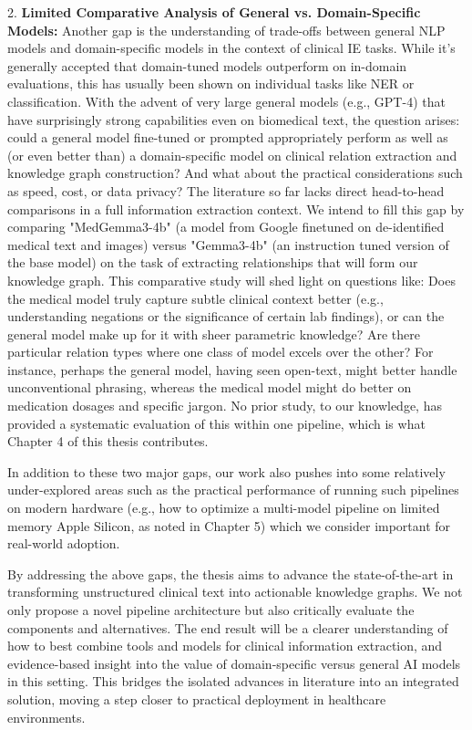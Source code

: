 2. \textbf{Limited Comparative Analysis of General vs. Domain-Specific Models:} Another gap is the understanding of trade-offs between general NLP models and domain-specific models in the context of clinical IE tasks. While it's generally accepted that domain-tuned models outperform on in-domain evaluations, this has usually been shown on individual tasks like NER or classification. With the advent of very large general models (e.g., GPT-4) that have surprisingly strong capabilities even on biomedical text, the question arises: could a general model fine-tuned or prompted appropriately perform as well as (or even better than) a domain-specific model on clinical relation extraction and knowledge graph construction? And what about the practical considerations such as speed, cost, or data privacy? The literature so far lacks direct head-to-head comparisons in a full information extraction context. We intend to fill this gap by comparing "MedGemma3-4b" (a model from Google finetuned on de-identified medical text and images) versus "Gemma3-4b" (an instruction tuned version of the base model) on the task of extracting relationships that will form our knowledge graph. This comparative study will shed light on questions like: Does the medical model truly capture subtle clinical context better (e.g., understanding negations or the significance of certain lab findings), or can the general model make up for it with sheer parametric knowledge? Are there particular relation types where one class of model excels over the other? For instance, perhaps the general model, having seen open-text, might better handle unconventional phrasing, whereas the medical model might do better on medication dosages and specific jargon. No prior study, to our knowledge, has provided a systematic evaluation of this within one pipeline, which is what Chapter 4 of this thesis contributes.

In addition to these two major gaps, our work also pushes into some relatively under-explored areas such as the practical performance of running such pipelines on modern hardware (e.g., how to optimize a multi-model pipeline on limited memory Apple Silicon, as noted in Chapter 5) which we consider important for real-world adoption.

By addressing the above gaps, the thesis aims to advance the state-of-the-art in transforming unstructured clinical text into actionable knowledge graphs. We not only propose a novel pipeline architecture but also critically evaluate the components and alternatives. The end result will be a clearer understanding of how to best combine tools and models for clinical information extraction, and evidence-based insight into the value of domain-specific versus general AI models in this setting. This bridges the isolated advances in literature into an integrated solution, moving a step closer to practical deployment in healthcare environments.
